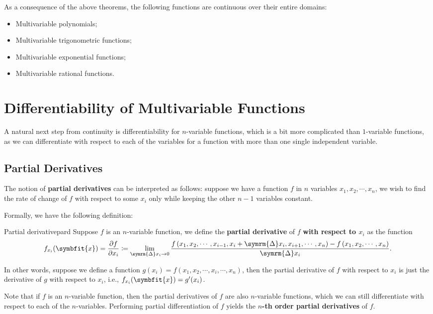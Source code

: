 \documentclass[math]{amznotes}
\theoremstyle{remark}
\begin{document}
As a consequence of the above theorems, the following functions are continuous over their entire domains:
\begin{itemize}
    \item Multivariable polynomials;
    \item Multivariable trigonometric functions;
    \item Multivariable exponential functions;
    \item Multivariable rational functions.
\end{itemize}
\section{Differentiability of Multivariable Functions}
A natural next step from continuity is differentiability for $n$-variable functions, which is a bit more complicated than $1$-variable functions, as we can differentiate with respect to each of the variables for a function with more than one single independent variable.
\subsection{Partial Derivatives}
The notion of {\color{red} \textbf{partial derivatives}} can be interpreted as follows: suppose we have a function $f$ in $n$ variables $x_1, x_2, \cdots, x_n$, we wish to find the rate of change of $f$ with respect to some $x_i$ only while keeping the other $n - 1$ variables constant.

Formally, we have the following definition:
\begin{dfnbox}{Partial derivative}{pard}
    Suppose $f$ is an $n$-variable function, we define the {\color{red} \textbf{partial derivative}} of $f$ {\color{red} \textbf{with respect to $x_i$}} as the function
    \begin{equation*}
        f_{x_i}(\symbfit{x}) = \frac{\partial f}{\partial x_i} \coloneq \lim_{\symrm{\Delta}x_i \to 0}\frac{f\left(x_1, x_2, \cdots, x_{i - 1}, x_i + \symrm{\Delta}x_i, x_{i + 1}, \cdots, x_n\right) - f \left(x_1, x_2, \cdots, x_n\right)}{\symrm{\Delta}x_i}.
    \end{equation*}
\end{dfnbox}
In other words, suppose we define a function $g(x_i) = f(x_1, x_2, \cdots, x_i, \cdots, x_n)$, then the partial derivative of $f$ with respect to $x_i$ is just the derivative of $g$ with respect to $x_i$, i.e., $f_{x_i}(\symbfit{x}) = g'(x_i)$.

Note that if $f$ is an $n$-variable function, then the partial derivatives of $f$ are also $n$-variable functions, which we can still differentiate with respect to each of the $n$-variables. Performing partial differentiation of $f$ yields the {\color{red} \textbf{$n$-th order partial derivatives}} of $f$.
\end{document}
